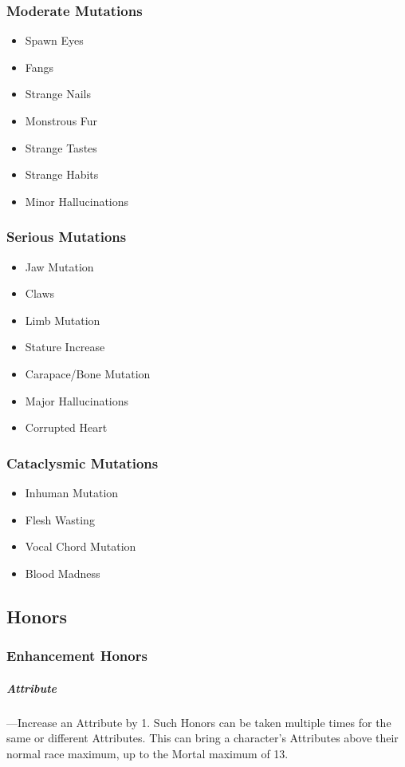 \documentclass[oneside,11pt,english]{book}
\begin{document}
\subsubsection{Moderate Mutations}\label{sec:Mutation-Moderate}
\begin{itemize}
	[noitemsep]
	\item Spawn Eyes 
	\item Fangs 
	\item Strange Nails 
	\item Monstrous Fur 
	\item Strange Tastes 
	\item Strange Habits 
	\item Minor Hallucinations 
\end{itemize}

\subsubsection{Serious Mutations}\label{sec:Mutation-Serious}
\begin{itemize}
	[noitemsep]
	\item Jaw Mutation 
	\item Claws 
	\item Limb Mutation 
	\item Stature Increase 
	\item Carapace/Bone Mutation 
	\item Major Hallucinations 
	\item Corrupted Heart 
\end{itemize}

\subsubsection{Cataclysmic Mutations}\label{sec:Mutation-Cataclysmic}
\begin{itemize}
	[noitemsep]
	\item Inhuman Mutation
	\item Flesh Wasting
	\item Vocal Chord Mutation
	\item Blood Madness
\end{itemize}
\subsection{Honors}
\subsubsection{Enhancement Honors}
\subparagraph{Attribute}\label{honor:Attribute}
---\quad Increase an Attribute by 1. Such Honors can be taken multiple times for the same or 
different Attributes. This can bring a character’s Attributes above their normal race maximum, up 
to the Mortal maximum of 13. 
\end{document}
